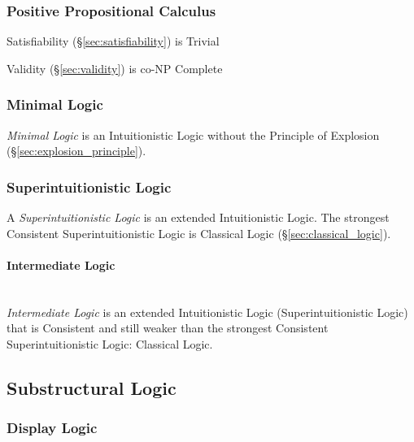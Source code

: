 \subsubsection{Positive Propositional Calculus}
\label{sec:positive_propositional}

Satisfiability (\S\ref{sec:satisfiability}) is Trivial

Validity (\S\ref{sec:validity}) is co-NP Complete %



\subsubsection{Minimal Logic}\label{sec:minimal_logic}

\emph{Minimal Logic} is an Intuitionistic Logic without the Principle
of Explosion (\S\ref{sec:explosion_principle}).



\subsubsection{Superintuitionistic Logic}
\label{sec:superintuitionistic_logic}

A \emph{Superintuitionistic Logic} is an extended Intuitionistic
Logic. The strongest Consistent Superintuitionistic Logic is Classical
Logic (\S\ref{sec:classical_logic}).



\paragraph{Intermediate Logic}\label{sec:intermediate_logic}
\hfill \\

\emph{Intermediate Logic} is an extended Intuitionistic Logic
(Superintuitionistic Logic) that is Consistent and still weaker than
the strongest Consistent Superintuitionistic Logic: Classical Logic.



\subsection{Substructural Logic}\label{sec:substructural_logic}

\subsubsection{Display Logic}\label{sec:display_logic}

